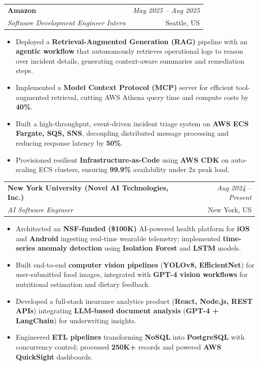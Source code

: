 \documentclass[a4paper,10pt]{article}
\makeatletter
\newcommand{\resumeSubheading}[4]{
\vspace{0.3mm}\item
    \begin{tabular*}{0.98\textwidth}[t]{l@{\extracolsep{\fill}}r}
        \textbf{#1} & \textit{\footnotesize{#4}} \\
        \textit{\footnotesize{#3}} & \footnotesize{#2}\\
    \end{tabular*}\vspace{-2mm}
}
\newcommand{\resumeItemListStart}{\begin{itemize}[leftmargin=*, labelsep=1mm, itemsep=0pt]}
\newcommand{\resumeItemListEnd}{\end{itemize}\vspace{-2mm}}
\makeatother
\begin{document}
\resumeSubheading
{Amazon}{Seattle, US}
{Software Development Engineer Intern}{May 2025 -- Aug 2025}
\resumeItemListStart
\item \footnotesize{Deployed a \textbf{Retrieval-Augmented Generation (RAG)} pipeline with an \textbf{agentic workflow} that autonomously retrieves operational logs to reason over incident details, generating context-aware summaries and remediation steps.}
\item \footnotesize{Implemented a \textbf{Model Context Protocol (MCP)} server for efficient tool-augmented retrieval, cutting AWS Athena query time and compute costs by \textbf{40\%}.}
\item \footnotesize{Built a high-throughput, event-driven incident triage system on \textbf{AWS ECS Fargate, SQS, SNS}, decoupling distributed message processing and reducing response latency by \textbf{50\%}.}
\item \footnotesize{Provisioned resilient \textbf{Infrastructure-as-Code} using \textbf{AWS CDK} on auto-scaling ECS clusters, ensuring \textbf{99.9\%} availability under 2x peak load.}
\resumeItemListEnd

\resumeSubheading
{New York University (Novel AI Technologies, Inc.)}{New York, US}
{AI Software Engineer}{Aug 2024 -- Present}
\resumeItemListStart
\item \footnotesize{Architected an \textbf{NSF-funded (\$100K)} AI-powered health platform for \textbf{iOS} and \textbf{Android} ingesting real-time wearable telemetry; implemented \textbf{time-series anomaly detection} using \textbf{Isolation Forest} and \textbf{LSTM} models.}
\item \footnotesize{Built end-to-end \textbf{computer vision pipelines} (\textbf{YOLOv8, EfficientNet}) for user-submitted food images, integrated with \textbf{GPT-4 vision workflows} for nutritional estimation and dietary feedback.}
\item \footnotesize{Developed a full-stack insurance analytics product (\textbf{React, Node.js, REST APIs}) integrating \textbf{LLM-based document analysis} (\textbf{GPT-4 + LangChain}) for underwriting insights.}
\item \footnotesize{Engineered \textbf{ETL pipelines} transforming \textbf{NoSQL} into \textbf{PostgreSQL} with concurrency control; processed \textbf{250K+} records and powered \textbf{AWS QuickSight} dashboards.}
\resumeItemListEnd
\end{document}
